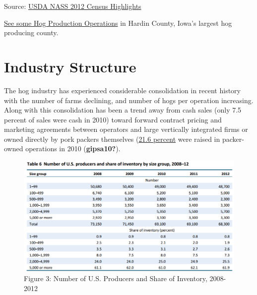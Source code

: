 \documentclass[
  letterpaper,
  DIV=11,
  numbers=noendperiod]{scrreprt}
\begin{document}
Source: \href{pdf-Readings/12CensusHighlightsHogs.pdf}{USDA NASS 2012
Census Highlights}

\href{https://www.google.com/maps/place/Hardin+County,+IA/@42.3833668,-93.3907209,60627m/data=!3m2!1e3!4b1!4m2!3m1!1s0x87ee2ed39f2db5df:0x67a785cf003d5369!6m1!1e1}{See
some Hog Production Operations} in Hardin County, Iowa's largest hog
producing county.

\hypertarget{industry-structure}{%
\section{Industry Structure}\label{industry-structure}}

The hog industry has experienced considerable consolidation in recent
history with the number of farms declining, and number of hogs per
operation increasing. Along with this consolidation has been a trend
away from cash sales (only 7.5 percent of sales were cash in 2010)
toward forward contract pricing and marketing agreements between
operators and large vertically integrated firms or owned directly by
pork packers themselves (\href{pdf-readings/gipsa10.pdf}{21.6 percent}
were raised in packer-owned operations in 2010 (\textbf{gipsa10?}).

\begin{figure}

{\centering \includegraphics{images/numberproducersshare.png}

}

\caption{Figure 3: Number of U.S. Producers and Share of Inventory,
2008-2012}

\end{figure}
\end{document}
